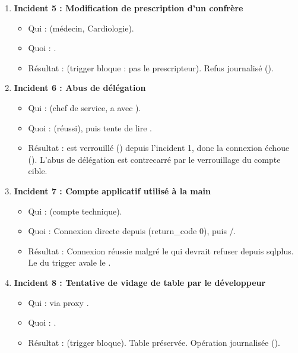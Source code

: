 \begin{enumerate}
\item \textbf{Incident 5 : Modification de prescription d'un confrère}
  \begin{itemize}
    \item Qui :  (médecin, Cardiologie).
    \item Quoi : .
    \item Résultat :  (trigger  bloque : pas le prescripteur). Refus journalisé ().
  \end{itemize}

\item \textbf{Incident 6 : Abus de délégation}
  \begin{itemize}
    \item Qui :  (chef de service, a  avec ).
    \item Quoi :  (réussi), puis  tente de lire .
    \item Résultat :  est verrouillé () depuis l'incident 1, donc la connexion échoue (). L'abus de délégation est contrecarré par le verrouillage du compte cible.
  \end{itemize}

\item \textbf{Incident 7 : Compte applicatif utilisé à la main}
  \begin{itemize}
    \item Qui :  (compte technique).
    \item Quoi : Connexion directe depuis  (return\_code 0), puis /.
    \item Résultat : Connexion réussie malgré le  qui devrait refuser  depuis sqlplus. Le  du trigger avale le .
  \end{itemize}

\item \textbf{Incident 8 : Tentative de vidage de table par le développeur}
  \begin{itemize}
    \item Qui :  via proxy .
    \item Quoi : .
    \item Résultat :  (trigger  bloque). Table préservée. Opération journalisée ().
  \end{itemize}
\end{enumerate}

